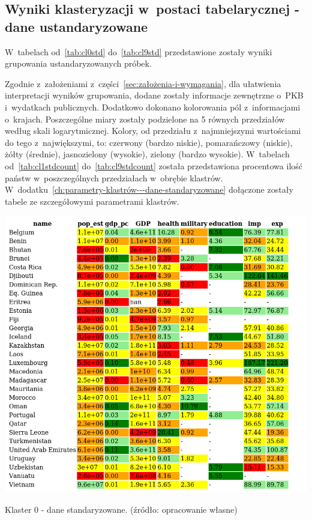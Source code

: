 \documentclass[11pt]{report}
\begin{document}
    \subsection{Wyniki klasteryzacji w~postaci tabelarycznej - dane ustandaryzowane}
    W~tabelach od~\ref{tab:cl0std} do~\ref{tab:cl9std} przedstawione zostały wyniki grupowania ustandaryzowanych próbek.

    Zgodnie z~założeniami z~części~\ref{sec:założenia-i-wymagania}, dla ułatwienia interpretacji wyników grupowania, dodane zostały informacje zewnętrzne o~PKB i~wydatkach publicznych.
    Dodatkowo dokonano kolorowania pól z~informacjami o~krajach.
    Poszczególne miary zostały podzielone na 5 równych przedziałów według skali logarytmicznej.
    Kolory, od przedziału z~najmniejszymi wartościami do tego z~największymi, to: czerwony (bardzo niskie), pomarańczowy (niskie), żółty (średnie), jasnozielony (wysokie), zielony (bardzo wysokie).
    W~tabelach od~\ref{tab:cl1stdcount} do~\ref{tab:cl9stdcount} została przedstawiona procentowa ilość państw w~poszczególnych przedziałach w~obrębie klastrów.
    W~dodatku~\ref{ch:parametry-klastrów---dane-standaryzowane} dołączone zostały tabele ze szczegółowymi parametrami klastrów.

    \begin{table}[!htp]
        \centering
        \includegraphics[width=\linewidth]{tables/CLUST/cluster0stdkmeans.png}
        \caption{Klaster 0 - dane standaryzowane. (źródło: opracowanie własne)}
        \label{tab:cl0std}
    \end{table}
\end{document}
